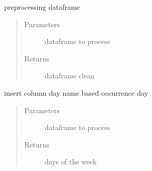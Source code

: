 \documentclass[letterpaper,10pt,english]{sphinxmanual}
\begin{document}
\begin{fulllineitems}
\label{\detokenize{algorithms:algorithms.idp.idp.preprocessing}}
\sphinxAtStartPar
preprocessing dataframe
\begin{quote}\begin{description}
\item[{Parameters}] \leavevmode
\sphinxAtStartPar
{} \textendash{} dataframe to process

\item[{Returns}] \leavevmode
\sphinxAtStartPar
dataframe clean

\end{description}\end{quote}

\end{fulllineitems}


\sphinxAtStartPar
{}

\label{\detokenize{algorithms:module-algorithms.idp.idp_utils}}

\begin{fulllineitems}
\label{\detokenize{algorithms:algorithms.idp.idp_utils.insert_column_day_name_based_occurrence_day}}
\sphinxAtStartPar
insert column day name based occurrence day
\begin{quote}\begin{description}
\item[{Parameters}] \leavevmode
\sphinxAtStartPar
{} \textendash{} dataframe to process

\item[{Returns}] \leavevmode
\sphinxAtStartPar
days of the week

\end{description}\end{quote}

\end{fulllineitems}
\end{document}
